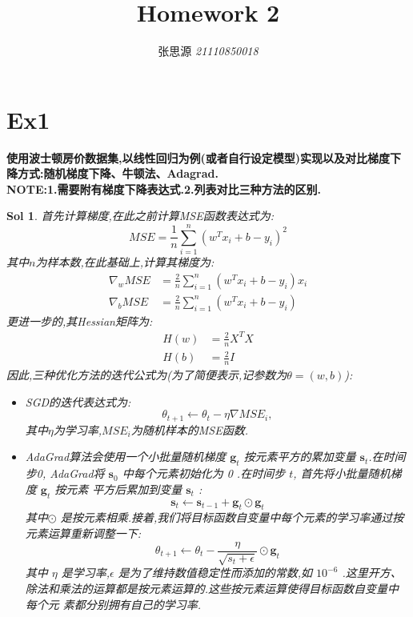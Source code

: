 \label{key}\documentclass[UTF8,a4paper,11pt]{ctexart}
\title{\textbf{Homework 2}}
\author{ 张思源  \qquad  \textit{21110850018} }   %
\newtheorem{sol}{Sol}[section]
\begin{document}
\maketitle
\section{Ex1}
\textbf{使用波士顿房价数据集,以线性回归为例(或者自行设定模型)实现以及对比梯度下降方式:随机梯度下降、牛顿法、Adagrad.\\
NOTE:1.需要附有梯度下降表达式.2.列表对比三种方法的区别.}
\begin{sol}
	首先计算梯度,在此之前计算MSE函数表达式为:
	$$
	MSE=\frac{1}{n}\sum_{i=1}^{n}(w^{T}x_{i}+b-y_{i})^{2}
	$$
	其中$n$为样本数,在此基础上,计算其梯度为:
	\begin{equation*}
		\begin{split}
			\nabla_{w} MSE&=\frac{2}{n}\sum_{i=1}^{n}(w^{T}x_{i}+b-y_{i})x_{i}\\
			\nabla_{b} MSE&=\frac{2}{n}\sum_{i=1}^{n}(w^{T}x_{i}+b-y_{i})
		\end{split}
	\end{equation*}
	更进一步的,其Hessian矩阵为:
	\begin{equation*}
		\begin{split}
			H(w)&=\frac{2}{n}X^{T}X\\
			H(b)&=\frac{2}{n}I
		\end{split}
	\end{equation*}
因此,三种优化方法的迭代公式为(为了简便表示,记参数为$\theta=(w,b)$):
\begin{itemize}
	\item SGD的迭代表达式为:$$\theta_{t+1} \leftarrow \theta_{t}-\eta \nabla MSE_{i},$$其中$\eta$为学习率,$MSE_{i}$为随机样本的MSE函数.
	\item AdaGrad算法会使用一个小批量随机梯度 $\boldsymbol{g}_{t}$ 按元素平方的累加变量 $\boldsymbol{s}_{t} $.在时间步0, AdaGrad将 $\boldsymbol{s}_{0}$ 中每个元素初始化为 0 .在时间步 $t$, 首先将小批量随机梯度 $\boldsymbol{g}_{t}$ 按元素 平方后累加到变量 $\boldsymbol{s}_{t}$ :
	$$
	\boldsymbol{s}_{t} \leftarrow \boldsymbol{s}_{t-1}+\boldsymbol{g}_{t} \odot \boldsymbol{g}_{t}
	$$
	其中$\odot$ 是按元素相乘.接着,我们将目标函数自变量中每个元素的学习率通过按元素运算重新调整一下:
	$$
	\theta_{t+1} \leftarrow \theta_{t}-\frac{\eta}{\sqrt{s_{t}+\epsilon}} \odot \boldsymbol{g}_{t}
	$$
	其中 $\eta$ 是学习率,$\epsilon$ 是为了维持数值稳定性而添加的常数,如 $10^{-6}$ .这里开方、除法和乘法的运算都是按元素运算的.这些按元素运算使得目标函数自变量中每个元 素都分别拥有自己的学习率.

\end{itemize}
\end{sol}
\end{document}
